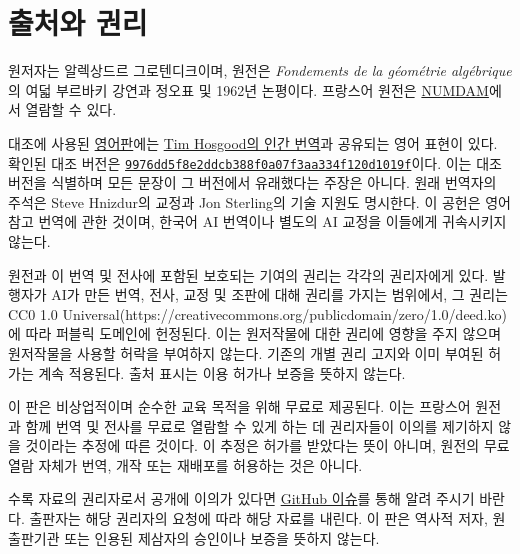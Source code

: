 \chapter*{출처와 권리}
원저자는 알렉상드르 그로텐디크이며, 원전은
\emph{Fondements de la géométrie algébrique}의 여덟 부르바키 강연과
정오표 및 1962년 논평이다. 프랑스어 원전은
\href{https://www.numdam.org/}{NUMDAM}에서 열람할 수 있다.

대조에 사용된 \href{https://github.com/KokunoYumeto/fga-en}{영어판}에는
\href{https://github.com/thosgood/fga}{Tim Hosgood의 인간 번역}과 공유되는
영어 표현이 있다. 확인된 대조 버전은
\href{https://github.com/thosgood/fga/tree/9976dd5f8e2ddcb388f0a07f3aa334f120d1019f}{\nolinkurl{9976dd5f8e2ddcb388f0a07f3aa334f120d1019f}}이다.
이는 대조 버전을 식별하며 모든 문장이 그 버전에서 유래했다는 주장은 아니다.
원래 번역자의 주석은 Steve Hnizdur의 교정과 Jon Sterling의 기술 지원도
명시한다. 이 공헌은 영어 참고 번역에 관한 것이며, 한국어 AI 번역이나
별도의 AI 교정을 이들에게 귀속시키지 않는다.

원전과 이 번역 및 전사에 포함된 보호되는 기여의 권리는 각각의 권리자에게
있다. 발행자가 AI가 만든 번역, 전사, 교정 및 조판에 대해 권리를 가지는 범위에서, 그 권리는 CC0 1.0 Universal(https://creativecommons.org/publicdomain/zero/1.0/deed.ko)에 따라 퍼블릭 도메인에 헌정된다. 이는 원저작물에 대한 권리에 영향을 주지 않으며 원저작물을 사용할 허락을 부여하지 않는다. 기존의 개별 권리 고지와 이미 부여된
허가는 계속 적용된다. 출처 표시는 이용 허가나 보증을 뜻하지 않는다.

이 판은 비상업적이며 순수한 교육 목적을 위해 무료로 제공된다. 이는
프랑스어 원전과 함께 번역 및 전사를 무료로 열람할 수 있게 하는 데
권리자들이 이의를 제기하지 않을 것이라는 추정에 따른 것이다.
이 추정은 허가를 받았다는 뜻이 아니며, 원전의 무료 열람 자체가 번역,
개작 또는 재배포를 허용하는 것은 아니다.

수록 자료의 권리자로서 공개에 이의가 있다면
\href{https://github.com/KokunoYumeto/fga-ko/issues}{GitHub 이슈}를 통해
알려 주시기 바란다. 출판자는 해당 권리자의 요청에 따라 해당 자료를 내린다.
이 판은 역사적 저자, 원 출판기관 또는 인용된 제삼자의 승인이나 보증을
뜻하지 않는다.
\clearpage

